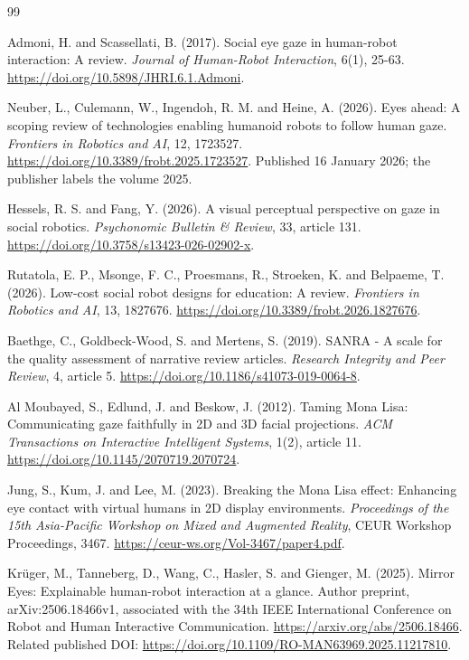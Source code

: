 \documentclass[11pt,a4paper]{article}
\begin{document}
\begin{thebibliography}{99}

 Admoni, H. and Scassellati, B. (2017). Social eye gaze in human-robot interaction: A review. \emph{Journal of Human-Robot Interaction}, 6(1), 25-63. \url{https://doi.org/10.5898/JHRI.6.1.Admoni}.

 Neuber, L., Culemann, W., Ingendoh, R. M. and Heine, A. (2026). Eyes ahead: A scoping review of technologies enabling humanoid robots to follow human gaze. \emph{Frontiers in Robotics and AI}, 12, 1723527. \url{https://doi.org/10.3389/frobt.2025.1723527}. Published 16 January 2026; the publisher labels the volume 2025.

 Hessels, R. S. and Fang, Y. (2026). A visual perceptual perspective on gaze in social robotics. \emph{Psychonomic Bulletin \& Review}, 33, article 131. \url{https://doi.org/10.3758/s13423-026-02902-x}.

 Rutatola, E. P., Msonge, F. C., Proesmans, R., Stroeken, K. and Belpaeme, T. (2026). Low-cost social robot designs for education: A review. \emph{Frontiers in Robotics and AI}, 13, 1827676. \url{https://doi.org/10.3389/frobt.2026.1827676}.

 Baethge, C., Goldbeck-Wood, S. and Mertens, S. (2019). SANRA - A scale for the quality assessment of narrative review articles. \emph{Research Integrity and Peer Review}, 4, article 5. \url{https://doi.org/10.1186/s41073-019-0064-8}.

 Al Moubayed, S., Edlund, J. and Beskow, J. (2012). Taming Mona Lisa: Communicating gaze faithfully in 2D and 3D facial projections. \emph{ACM Transactions on Interactive Intelligent Systems}, 1(2), article 11. \url{https://doi.org/10.1145/2070719.2070724}.

 Jung, S., Kum, J. and Lee, M. (2023). Breaking the Mona Lisa effect: Enhancing eye contact with virtual humans in 2D display environments. \emph{Proceedings of the 15th Asia-Pacific Workshop on Mixed and Augmented Reality}, CEUR Workshop Proceedings, 3467. \url{https://ceur-ws.org/Vol-3467/paper4.pdf}.

 Krüger, M., Tanneberg, D., Wang, C., Hasler, S. and Gienger, M. (2025). Mirror Eyes: Explainable human-robot interaction at a glance. Author preprint, arXiv:2506.18466v1, associated with the 34th IEEE International Conference on Robot and Human Interactive Communication. \url{https://arxiv.org/abs/2506.18466}. Related published DOI: \url{https://doi.org/10.1109/RO-MAN63969.2025.11217810}.


\end{thebibliography}
\end{document}
